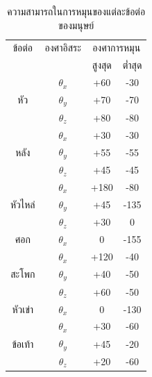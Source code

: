 \begin{table}[htbp]
	\centering
	\begin{tabular}{|c|c|c|c|}
		\hline
		{ข้อต่อ}&{องศาอิสระ}&\multicolumn{2}{c|}{องศาการหมุน}\\
		\cline{3-4}
		{}                                     & {}         & {สูงสุด} & {ต่ำสุด} \\
		\hline
		\multirow{3}{*}{หัว}             & $\theta_x$ & +60                  & -30                  \\
		\cline{3-4}
		                                       & $\theta_y$ & +70                  & -70                  \\
		\cline{3-4}
		                                       & $\theta_z$ & +80                  & -80                  \\
		\hline
		\multirow{3}{*}{หลัง}          & $\theta_x$ & +30                  & -30                  \\
		\cline{3-4}
		                                       & $\theta_y$ & +55                  & -55                  \\
		\cline{3-4}
		                                       & $\theta_z$ & +45                  & -45                  \\
		\hline
		\multirow{3}{*}{หัวไหล่} & $\theta_x$ & +180                 & -80                  \\
		\cline{3-4}
		                                       & $\theta_y$ & +45                  & -135                 \\
		\cline{3-4}
		                                       & $\theta_z$ & +30                  & 0                    \\
		\hline
		{ศอก}                            & $\theta_x$ & 0                    & -155                 \\
		\hline
		\multirow{3}{*}{สะโพก}       & $\theta_x$ & +120                 & -40                  \\
		\cline{3-4}
		                                       & $\theta_y$ & +40                  & -50                  \\
		\cline{3-4}
		                                       & $\theta_z$ & +60                  & -50                  \\
		\hline
        {หัวเข่า}                & $\theta_x$ & 0                    & -130                 \\
        \hline
		\multirow{3}{*}{ข้อเท้า} & $\theta_x$ & +30                  & -60                  \\
		\cline{3-4}
		                                       & $\theta_y$ & +45                  & -20                  \\
		\cline{3-4}
		                                       & $\theta_z$ & +20                  & -60                  \\
		\hline
	\end{tabular}
	\caption{ความสามารถในการหมุนของแต่ละข้อต่อของมนุษย์}
	\label{tab:human_joint_limit}
\end{table}


